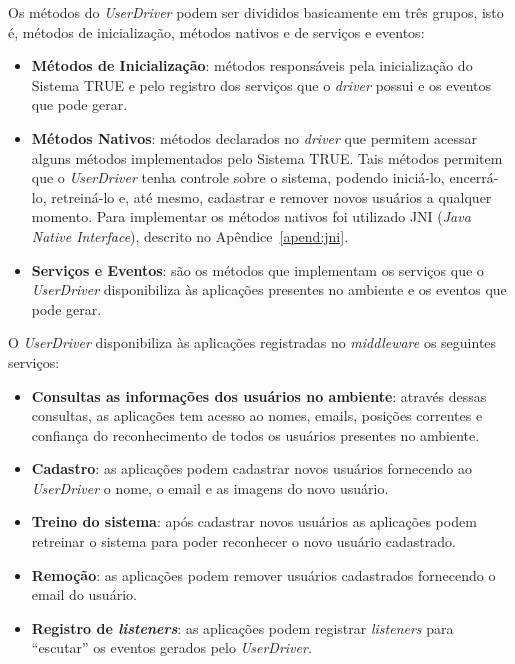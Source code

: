 Os métodos do \textit{UserDriver} podem ser divididos basicamente em três grupos, isto é, métodos de inicialização, métodos nativos e de serviços e eventos:

\begin{itemize}
	\item \textbf{Métodos de Inicialização}: métodos responsáveis pela inicialização do Sistema TRUE e pelo registro dos serviços que o \textit{driver} possui e os eventos que pode gerar.

	\item \textbf{Métodos Nativos}: métodos declarados no \textit{driver} que permitem acessar alguns métodos implementados pelo Sistema TRUE. Tais métodos permitem que o \textit{UserDriver} tenha controle sobre o sistema, podendo iniciá-lo, encerrá-lo, retreiná-lo e, até mesmo, cadastrar e remover novos usuários a qualquer momento. Para implementar os métodos nativos foi utilizado JNI (\textit{Java Native Interface}), descrito no Apêndice~\ref{apend:jni}.

	\item \textbf{Serviços e Eventos}: são os métodos que implementam os serviços que o \textit{UserDriver} disponibiliza às aplicações presentes no ambiente e os eventos que pode gerar. 


\end{itemize}



	O \textit{UserDriver} disponibiliza às aplicações registradas no
	\textit{middleware} os seguintes serviços:

	\begin{itemize}
		\item \textbf{Consultas as informações dos usuários no ambiente}: através dessas consultas, as aplicações tem acesso ao nomes, emails, posições correntes e confiança do reconhecimento de todos os usuários presentes no ambiente.
		\item \textbf{Cadastro}: as aplicações podem cadastrar novos usuários fornecendo ao \textit{UserDriver} o nome, o email e as imagens do novo usuário.
		\item \textbf{Treino do sistema}: após cadastrar novos usuários as aplicações podem retreinar o sistema para poder reconhecer o novo usuário cadastrado.
		\item \textbf{Remoção}: as aplicações podem remover usuários cadastrados fornecendo o email do usuário.
		\item \textbf{Registro de \textit{listeners}}: as aplicações podem registrar \textit{listeners} para ``escutar'' os eventos gerados pelo \textit{UserDriver}.
	\end{itemize}

